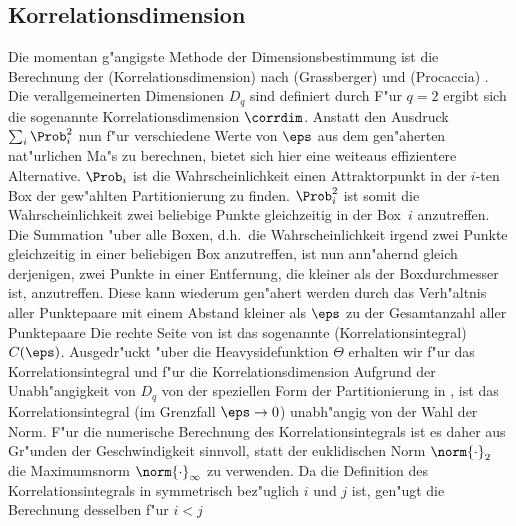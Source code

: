 \subsection{Korrelationsdimension}
\label{chapcorrdim}


Die momentan g"angigste Methode der Dimensionsbestimmung ist die Berechnung der
\begriff(Korrelationsdimension) nach \autor(Grassberger) und \autor(Procaccia)
\cite{grassberger-procaccia}. Die verallgemeinerten Dimensionen $D_q$ sind definiert durch
F"ur $q=2$ ergibt sich die sogenannte Korrelationsdimension $\corrdim$.
Anstatt den Ausdruck $\sum_i \Prob_i^2$ nun f"ur verschiedene Werte von $\eps$ aus dem
gen"aherten nat"urlichen Ma"s zu berechnen, bietet sich hier eine weiteaus effizientere
Alternative. $\Prob_i$ ist die Wahrscheinlichkeit einen Attraktorpunkt in der $i$-ten Box der
gew"ahlten Partitionierung zu finden. $\Prob_i^2$ ist somit die Wahrscheinlichkeit zwei beliebige Punkte
gleichzeitig in der Box~$i$ anzutreffen. Die Summation "uber alle Boxen, d.h.\  die
Wahrscheinlichkeit irgend zwei Punkte gleichzeitig in einer beliebigen Box anzutreffen,
ist nun ann"ahernd gleich derjenigen, zwei Punkte in einer Entfernung, die kleiner
als der Boxdurchmesser ist, anzutreffen. Diese kann wiederum gen"ahert werden durch das Verh"altnis
aller Punktepaare mit einem Abstand kleiner als $\eps$ zu der Gesamtanzahl aller
Punktepaare
Die rechte Seite von  ist das sogenannte
\begriff(Korrelationsintegral) $C(\eps)$. Ausgedr"uckt "uber die Heavysidefunktion $\Theta$ 
erhalten wir f"ur das Korrelationsintegral
und f"ur die Korrelationsdimension 
Aufgrund der Unabh"angigkeit von $D_q$ von der speziellen Form der Partitionierung in
, ist das Korrelationsintegral (im Grenzfall $\eps\to0$) unabh"angig von
der Wahl der Norm. F"ur die numerische Berechnung des Korrelationsintegrals ist es daher
aus Gr"unden der Geschwindigkeit sinnvoll, statt der euklidischen Norm $\norm{\cdot}_2$ die
Maximumsnorm $\norm{\cdot}_\infty$ zu verwenden. Da die Definition des
Korrelationsintegrals in  symmetrisch bez"uglich $i$ und $j$ ist, gen"ugt
die Berechnung desselben f"ur $i<j$

